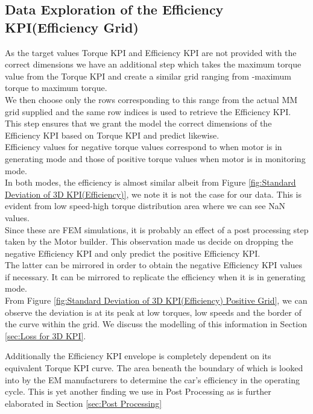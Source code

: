 \documentclass{report} %
\begin{document}
\subsection{Data Exploration of the Efficiency \ac{KPI}(Efficiency Grid)}\label{sec:Deep Dive into 3D KPI}

As the target values Torque \ac{KPI} and Efficiency \ac{KPI} are not provided with the correct dimensions we have an additional step which takes the maximum torque value from the Torque \ac{KPI} and create a similar grid ranging from -maximum torque to maximum torque. \\
We then choose only the rows corresponding to this range from the actual MM grid supplied and the same row indices is used to retrieve the Efficiency \ac{KPI}. \\
This step ensures that we grant the model the correct dimensions of the Efficiency \ac{KPI} based on Torque \ac{KPI} and predict likewise.\\

Efficiency values for negative torque values correspond to when motor is in generating mode and those of positive torque values when motor is in monitoring mode.\\
In both modes, the efficiency is almost similar albeit from Figure \ref{fig:Standard Deviation of 3D KPI(Efficiency)}, we note it is not the case for our data. 
This is evident from low speed-high torque distribution area where we can see \ac{NaN} values.\\
Since these are \ac{FEM} simulations, it is probably an effect of a post processing step taken by the Motor builder.
This observation made us decide on dropping the negative Efficiency \ac{KPI} and only predict the positive Efficiency \ac{KPI}.\\
The latter can be mirrored in order to obtain the negative Efficiency \ac{KPI} values if necessary.
It can be mirrored to replicate the efficiency when it is in generating mode.\\

From Figure \ref{fig:Standard Deviation of 3D KPI(Efficiency) Positive Grid}, we can observe the deviation is at its peak at low torques, low speeds and the border of the curve within the grid.
We discuss the modelling of this information in Section \ref{sec:Loss for 3D KPI}.

Additionally the Efficiency \ac{KPI} envelope is completely dependent on its equivalent Torque \ac{KPI} curve. 
The area beneath the boundary of which is looked into by the \ac{EM} manufacturers to determine the car's efficiency in the operating cycle.
This is yet another finding we use in Post Processing as is further elaborated in Section \ref{sec:Post Processing}
\end{document}
